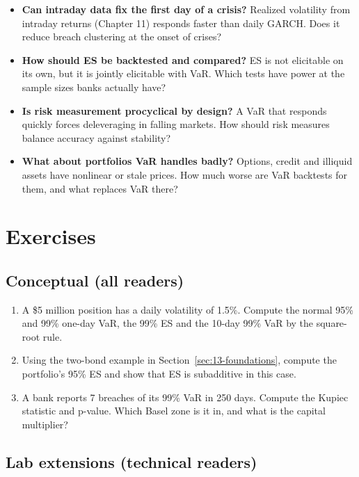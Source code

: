 \begin{itemize}
  \item \textbf{Can intraday data fix the first day of a crisis?} Realized volatility from intraday returns (Chapter 11) responds faster than daily GARCH. Does it reduce breach clustering at the onset of crises?
  \item \textbf{How should ES be backtested and compared?} ES is not elicitable on its own, but it is jointly elicitable with VaR. Which tests have power at the sample sizes banks actually have?
  \item \textbf{Is risk measurement procyclical by design?} A VaR that responds quickly forces deleveraging in falling markets. How should risk measures balance accuracy against stability?
  \item \textbf{What about portfolios VaR handles badly?} Options, credit and illiquid assets have nonlinear or stale prices. How much worse are VaR backtests for them, and what replaces VaR there?
\end{itemize}

\section*{Exercises}

\subsection*{Conceptual (all readers)}

\begin{enumerate}
  \item A \$5 million position has a daily volatility of 1.5\%. Compute the normal 95\% and 99\% one-day VaR, the 99\% ES and the 10-day 99\% VaR by the square-root rule.
  \item Using the two-bond example in Section~\ref{sec:13-foundations}, compute the portfolio's 95\% ES and show that ES is subadditive in this case.
  \item A bank reports 7 breaches of its 99\% VaR in 250 days. Compute the Kupiec statistic and p-value. Which Basel zone is it in, and what is the capital multiplier?
\end{enumerate}

\subsection*{Lab extensions (technical readers)}

